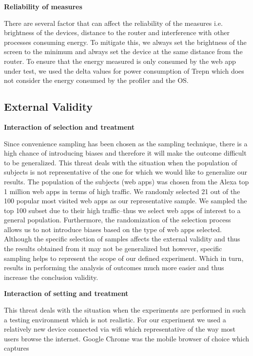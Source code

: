 \textbf{Reliability of measures}

There are several factor that can affect the reliability of the measures i.e. brightness of the devices, distance to the router and interference with other processes consuming energy. To mitigate this, we always set the brightness of the screen to the minimum and always set the device at the same distance from the router. To ensure that the energy measured is only consumed by the web app under test, we used the delta values for power consumption of Trepn which does not consider the energy consumed by the profiler and the OS.




\subsection{External Validity}

\textbf{Interaction of selection and treatment}

Since convenience sampling has been chosen as the sampling technique, there is a high chance of introducing biases and therefore it will make the outcome difficult to be generalized. This threat deals with the situation when the population of subjects is not representative of the one for which we would like to generalize our results. The population of the subjects (web apps) was chosen from the Alexa top 1 million web apps in terms of high traffic. We randomly selected 21 out of the 100 popular most visited web apps as our representative sample. We sampled the top 100 subset due to their high traffic--thus we select web apps of interest to a general population.  Furthermore, the randomization of the selection process allows us to not introduce biases based on the type of web apps selected.  
Although the specific selection of samples affects the external validity and thus the results obtained from it may not be generalized but however, specific sampling helps to represent the scope of our defined experiment. Which in turn, results in performing the analysis of outcomes much more easier and thus increase the conclusion validity. \newline


\textbf{Interaction of setting and treatment}

This threat deals with the situation when the experiments are performed in such a testing environment which is not realistic. For our experiment we used a relatively new device connected via wifi which representative of the way most users browse the internet. Google Chrome was the mobile browser of choice which captures 


